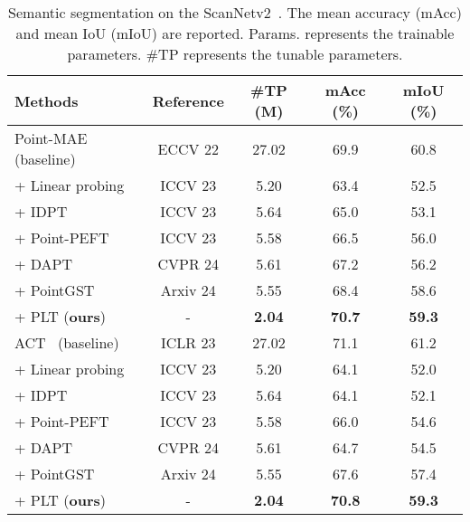 \begin{table}
  \centering
  \scriptsize
  \setlength{\tabcolsep}{1.5mm}
  \caption{Semantic segmentation on the ScanNetv2~\cite{dai2017scannet}. The
    mean accuracy (mAcc) and mean IoU (mIoU) are reported.
    Params. represents the trainable parameters. \#TP represents the tunable parameters.}
    \begin{tabular}{lcccc}
    \toprule
    Methods & Reference & \#TP (M)& mAcc (\%) & mIoU (\%) \\
    \midrule
    Point-MAE~\cite{pang2022masked} (baseline) &  ECCV 22 & 27.02 & 69.9 & 60.8 \\ 
    + Linear probing & ICCV 23 & 5.20  & 63.4  & 52.5  \\
    + IDPT~\cite{zha2023instance} & ICCV 23 & 5.64  & 65.0  & 53.1  \\
    + Point-PEFT~\cite{tang2024point} & ICCV 23 & 5.58  & 66.5  & 56.0  \\
    + DAPT~\cite{zhou2024dynamic} & CVPR 24 & 5.61  & 67.2 & 56.2 \\
    + PointGST~\cite{liang2024parameter} & Arxiv 24 & 5.55  & 68.4 & 58.6 \\
    \rowcolor{linecolor!40}+ PLT (\textbf{ours})& - & \textbf{2.04}  & \textbf{70.7} & \textbf{59.3} \\
    \midrule
    ACT~\cite{dong2022autoencoders} (baseline) &  ICLR 23 & 27.02 & 71.1 & 61.2 \\ 
    + Linear probing & ICCV 23 & 5.20  & 64.1  & 52.0  \\
    + IDPT~\cite{zha2023instance} & ICCV 23 & 5.64  & 64.1  & 52.1  \\
    + Point-PEFT~\cite{tang2024point} & ICCV 23 & 5.58  & 66.0  & 54.6  \\
    + DAPT~\cite{zhou2024dynamic} & CVPR 24 & 5.61  & 64.7 & 54.5 \\
    + PointGST~\cite{liang2024parameter} & Arxiv 24 & 5.55  & 67.6 & 57.4 \\
    \rowcolor{linecolor!40}+ PLT (\textbf{ours})& - & \textbf{2.04}  & \textbf{70.8} & \textbf{59.3} \\
    \bottomrule
    \end{tabular}
  \label{tab:scannetv2}
\end{table}
